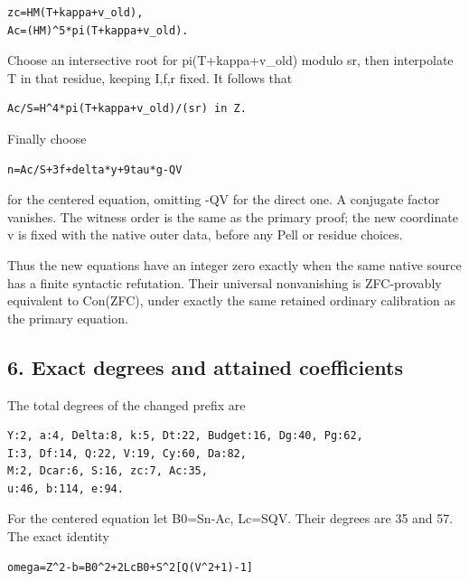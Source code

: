 \begin{verbatim}
zc=HM(T+kappa+v_old),
Ac=(HM)^5*pi(T+kappa+v_old).
\end{verbatim}

Choose an intersective root for pi(T+\allowbreak{}kappa+\allowbreak{}v\_\allowbreak{}old) modulo sr, then interpolate T in that residue, keeping I,f,r fixed. It follows that



\begin{verbatim}
Ac/S=H^4*pi(T+kappa+v_old)/(sr) in Z.
\end{verbatim}

Finally choose



\begin{verbatim}
n=Ac/S+3f+delta*y+9tau*g-QV
\end{verbatim}

for the centered equation, omitting -QV for the direct one. A conjugate factor vanishes. The witness order is the same as the primary proof; the new coordinate v is fixed with the native outer data, before any Pell or residue choices.



Thus the new equations have an integer zero exactly when the same native source has a finite syntactic refutation. Their universal nonvanishing is ZFC-provably equivalent to Con(ZFC), under exactly the same retained ordinary calibration as the primary equation.



\subsection*{6. Exact degrees and attained coefficients}



The total degrees of the changed prefix are



\begin{verbatim}
Y:2, a:4, Delta:8, k:5, Dt:22, Budget:16, Dg:40, Pg:62,
I:3, Df:14, Q:22, V:19, Cy:60, Da:82,
M:2, Dcar:6, S:16, zc:7, Ac:35,
u:46, b:114, e:94.
\end{verbatim}

For the centered equation let B0=\allowbreak{}Sn-Ac, Lc=\allowbreak{}SQV. Their degrees are 35 and 57. The exact identity



\begin{verbatim}
omega=Z^2-b=B0^2+2LcB0+S^2[Q(V^2+1)-1]
\end{verbatim}

